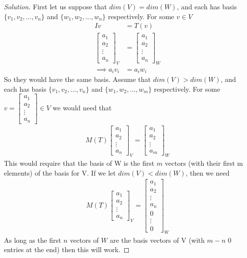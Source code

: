 \documentclass{article}
\newenvironment{solution}
  {\renewcommand{\qedsymbol}{}\begin{proof}[Solution]}
  {\end{proof}}
\begin{document}
\begin{solution}
  First let us suppose that $dim(V)=dim(W)$, and each has basis \ensuremath{\{v_1,v_2,...,v_{n}\}} and \ensuremath{\{w_1,w_2,...,w_{n}\}} respectively. For some $v\in V$
  \begin{align*}
    Iv&=T(v)\\
    \begin{bmatrix}a_1\\a_2\\ \vdots \\a_{n}\end{bmatrix}_V&=\begin{bmatrix}a_1\\a_2\\ \vdots \\a_{n}\end{bmatrix}_W\\
    \implies a_iv_i &= a_iw_i
  \end{align*}
  So they would have the same basis. Assume that $dim(V)>dim(W)$, and each has basis \ensuremath{\{v_1,v_2,...,v_{n}\}} and \ensuremath{\{w_1,w_2,...,w_{m}\}} respectively. For some $v=\begin{bmatrix}a_1\\a_2\\ \vdots \\a_{n}\end{bmatrix}\in V$ we would need that
  \begin{align*}
    M(T)\begin{bmatrix}a_1\\a_2\\ \vdots \\a_{n}\end{bmatrix}_V=\begin{bmatrix}a_1\\a_2\\ \vdots \\a_{m}\end{bmatrix}_W
  \end{align*}
  This would require that the basis of W is the first $m$ vectors (with their first m elements) of the basis for V. If we let $dim(V)<dim(W)$, then we need
  \begin{align*}
    M(T)\begin{bmatrix}a_1\\a_2\\ \vdots \\a_{n}\end{bmatrix}_V=\begin{bmatrix}a_1\\a_2\\ \vdots \\a_{n}\\0\\\vdots\\0\end{bmatrix}_W
  \end{align*}
  As long as the first $n$ vectors of $W$ are the basis vectors of V (with $m-n$ 0 entries at the end) then this will work.
\end{solution}
\end{document}
